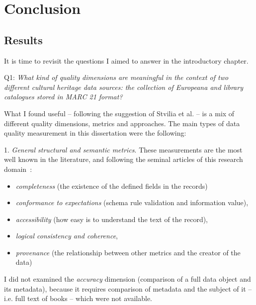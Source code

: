 \chapter{Conclusion}

\section{Results}

It is time to revisit the questions I aimed to answer in the introductory chapter.

Q1: \emph{What kind of quality dimensions are meaningful in the context of two different cultural heritage data sources: the collection of Europeana and library catalogues stored in MARC 21 format?}

What I found useful -- following the suggestion of Stvilia et al. \cite{stvilia2007} -- is a mix of different quality dimensions, metrics and approaches. The main types of data quality measurement in this dissertation were the following:

1. \emph{General structural and semantic metrics}. These measurements are the most well known in the literature, and following the seminal articles of this research domain~\cite{bruce-hillmann2004, ochoa-duval2009}:

\begin{itemize}
  \item \emph{completeness} (the existence of the defined fields in the records)
  \item \emph{conformance to expectations} (schema rule validation and information value),
  \item \emph{accessibility} (how easy is to understand the text of the record),
  \item \emph{logical consistency and coherence},
  \item \emph{provenance} (the relationship between other metrics and the creator of the data)
\end{itemize}

I did not examined the \emph{accuracy} dimension (comparison of a full data object and its metadata), because it requires comparison of metadata and the subject of it -- i.e. full text of books -- which were not available.

